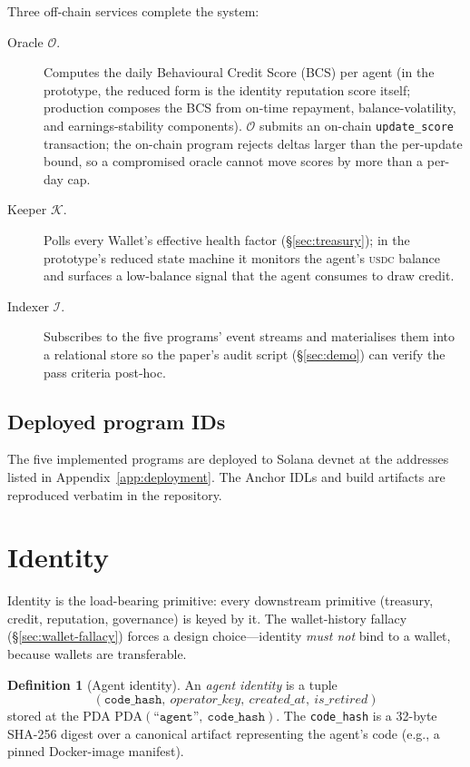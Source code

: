 \documentclass[10pt,conference,letterpaper]{IEEEtran}
\theoremstyle{definition}
\newtheorem{definition}[theorem]{Definition}
\newcommand{\codehash}{\texttt{code\_hash}}
\newcommand{\PDA}[1]{\ensuremath{\mathrm{PDA}(#1)}}
\newcommand{\USDC}{\textsc{usdc}}
\begin{document}
Three off-chain services complete the system:

\begin{description}
\item[Oracle $\mathcal{O}$.] Computes the daily Behavioural Credit
Score (BCS) per agent (in the prototype, the reduced form is the
identity reputation score itself; production composes the BCS from on-time
repayment, balance-volatility, and earnings-stability components).
$\mathcal{O}$ submits an on-chain \texttt{update\_score} transaction;
the on-chain program rejects deltas larger than the per-update bound,
so a compromised oracle cannot move scores by more than a per-day cap.
\item[Keeper $\mathcal{K}$.] Polls every Wallet's effective health
factor (\S\ref{sec:treasury}); in the prototype's reduced state
machine it monitors the agent's \USDC{} balance and surfaces a
low-balance signal that the agent consumes to draw credit.
\item[Indexer $\mathcal{I}$.] Subscribes to the five programs' event
streams and materialises them into a relational store so the paper's
audit script (\S\ref{sec:demo}) can verify the pass criteria
post-hoc.
\end{description}

\subsection{Deployed program IDs}

The five implemented programs are deployed to Solana devnet at the
addresses listed in Appendix~\ref{app:deployment}. The Anchor IDLs and
build artifacts are reproduced verbatim in the repository.

\section{Identity}\label{sec:identity}

Identity is the load-bearing primitive: every downstream primitive
(treasury, credit, reputation, governance) is keyed by it. The
wallet-history fallacy (\S\ref{sec:wallet-fallacy}) forces a design
choice---identity \emph{must not} bind to a wallet, because wallets
are transferable.

\begin{definition}[Agent identity]\label{def:agent-id}
An \emph{agent identity} is a tuple
\[
(\codehash,\ \mathit{operator\_key},\ \mathit{created\_at},\ \mathit{is\_retired})
\]
stored at the PDA $\PDA{\texttt{``agent''},\ \codehash}$. The \codehash{}
is a 32-byte SHA-256 digest over a canonical artifact representing the
agent's code (e.g., a pinned Docker-image manifest).
\end{definition}
\end{document}
